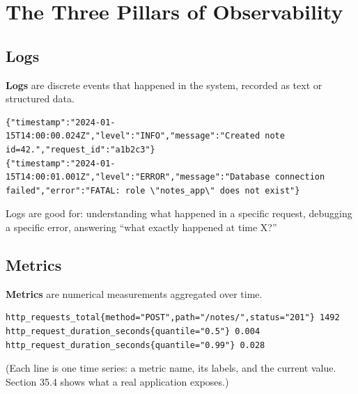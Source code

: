 \setcounter{section}{0}
\section{The Three Pillars of Observability}\label{35-observability:351-the-three-pillars-of-observability}

\subsection*{Logs}\label{35-observability:logs}

\textbf{Logs} are discrete events that happened in the system, recorded as text or structured data.

\begin{outputbox}[short]
\begin{Verbatim}[fontsize=\codesize, breaklines, breakanywhere, breaksymbolleft={\tiny\textcolor{muted}{$\hookrightarrow$}}]
{"timestamp":"2024-01-15T14:00:00.024Z","level":"INFO","message":"Created note id=42.","request_id":"a1b2c3"}
{"timestamp":"2024-01-15T14:00:01.001Z","level":"ERROR","message":"Database connection failed","error":"FATAL: role \"notes_app\" does not exist"}
\end{Verbatim}
\end{outputbox}

\noindent{}Logs are good for: understanding what happened in a specific request, debugging a specific error, answering ``what exactly happened at time X?''

\subsection*{Metrics}\label{35-observability:metrics}

\textbf{Metrics} are numerical measurements aggregated over time.

\begin{outputbox}[short]
\begin{Verbatim}[fontsize=\codesize, breaklines, breakanywhere, breaksymbolleft={\tiny\textcolor{muted}{$\hookrightarrow$}}]
http_requests_total{method="POST",path="/notes/",status="201"} 1492
http_request_duration_seconds{quantile="0.5"} 0.004
http_request_duration_seconds{quantile="0.99"} 0.028
\end{Verbatim}
\end{outputbox}

\noindent{}(Each line is one time series: a metric name, its labels, and the current value. Section 35.4 shows what a real application exposes.)

